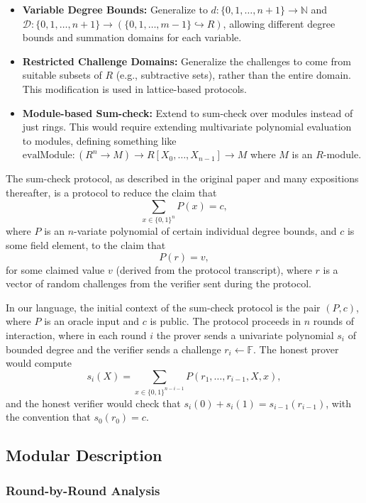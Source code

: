 \begin{itemize}
    \item \textbf{Variable Degree Bounds:} Generalize to $d : \{0, 1, \ldots, n+1\} \to \mathbb{N}$ and $\mathcal{D} : \{0, 1, \ldots, n+1\} \to (\{0, 1, \ldots, m-1\} \hookrightarrow R)$, allowing different degree bounds and summation domains for each variable.

    \item \textbf{Restricted Challenge Domains:} Generalize the challenges to come from suitable subsets of $R$ (e.g., subtractive sets), rather than the entire domain. This modification is used in lattice-based protocols.

    \item \textbf{Module-based Sum-check:} Extend to sum-check over modules instead of just rings. This would require extending multivariate polynomial evaluation to modules, defining something like $\text{evalModule} : (R^n \to M) \to R[X_0, \ldots, X_{n-1}] \to M$ where $M$ is an $R$-module.
\end{itemize}

The sum-check protocol, as described in the original paper and many expositions thereafter, is a
protocol to reduce the claim that \[ \sum_{x \in \{0, 1\}^n} P(x) = c, \] where $P$ is an
$n$-variate polynomial of certain individual degree bounds, and $c$ is some field element, to the
claim that \[ P(r) = v, \] for some claimed value $v$ (derived from the protocol transcript), where
$r$ is a vector of random challenges from the verifier sent during the protocol.

In our language, the initial context of the sum-check protocol is the pair $(P, c)$, where $P$ is an
oracle input and $c$ is public. The protocol proceeds in $n$ rounds of interaction, where in each
round $i$ the prover sends a univariate polynomial $s_i$ of bounded degree and the verifier sends a
challenge $r_i \gets \mathbb{F}$. The honest prover would compute \[ s_i(X) = \sum_{x \in \{0,
1\}^{n - i - 1}} P(r_1, \ldots, r_{i - 1}, X, x), \] and the honest verifier would check that
$s_i(0) + s_i(1) = s_{i - 1}(r_{i - 1})$, with the convention that $s_0(r_0) = c$.

\subsection{Modular Description}\label{sec:sumcheck_modular}

\subsubsection{Round-by-Round Analysis}

